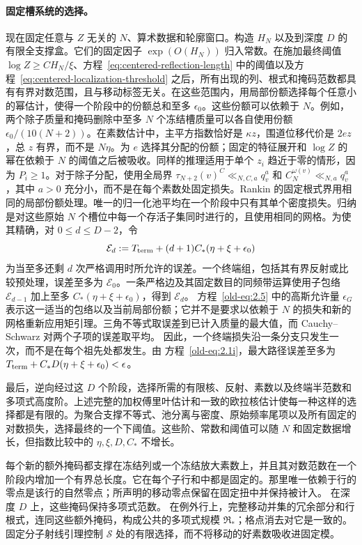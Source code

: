 \documentclass[11pt,a4paper]{article}
\numberwithin{equation}{section}
\numberwithin{figure}{section}
\theoremstyle{definition}
\theoremstyle{remark}
\begin{document}
\paragraph{固定槽系统的选择。}
现在固定任意与 \(Z\) 无关的 \(N\)、算术数据和轮廓窗口。构造 \(H_N\) 以及到深度 \(D\) 的有限全支撑盒。它们的固定因子 \(\exp(O(H_N))\) 归入常数。在施加最终阈值 \(\log Z\ge C H_N/\xi\)、方程~\eqref{eq:centered-reflection-length} 中的阈值以及方程~\eqref{eq:centered-localization-threshold} 之后，所有出现的列、根式和掩码范数都具有有界对数范围，且与移动标签无关。在这些范围内，用局部份额选择每个任意小的幂估计，使得一个阶段中的份额总和至多 \(\epsilon_0\)。这些份额可以依赖于 \(N\)。例如，两个除子质量和掩码删除中至多 \(N\) 个冻结槽质量可以各自使用份额 \(\epsilon_0/(10(N+2))\)。在素数估计中，主平方指数恰好是 \(\kappa z\)，围道位移代价是 \(2e z\)，总 \(z\) 有界，而不是 \(N\eta\)。为 \(e\) 选择其分配的份额；固定的特征展开和 \(\log Z\) 的幂在依赖于 \(N\) 的阈值之后被吸收。同样的推理适用于单个 \(z_i\) 趋近于零的情形，因为 \(P_i\ge1\)。对于除子分配，使用全局界 \(\tau_{N+2}(v)^C\ll_{N,C,a}q_v^a\) 和 \(C_N^{\omega(v)}\ll_{N,a}q_v^a\)，其中 \(a>0\) 充分小，而不是在每个素数处固定损失。Rankin 的固定根式界用相同的局部份额处理。唯一的归一化池平均在一个阶段中只有其单个密度损失。归纳是对这些原始 \(N\) 个槽位中每一个存活子集同时进行的，且使用相同的网格。为使其精确，对
\(0\le d\le D-2\)，令
\[
 \mathcal E_d
 :=T_{\rm term}+(d+1)C_*(\eta+\xi+\epsilon_0)
\]
为当至多还剩 \(d\) 次严格调用时所允许的误差。一个终端组，包括其有界反射或比较预处理，误差至多为 \(\mathcal E_0\)。一条严格边及其固定数目的同频带运算使用子包络
\(\mathcal E_{d-1}\) 加上至多
\(C_*(\eta+\xi+\epsilon_0)\)，得到 \(\mathcal E_d\)。
方程~\eqref{old-eq:2.5} 中的高斯允许量 \(\epsilon_G\) 表示这一适当的包络以及当前局部份额；它并不是要求以依赖于 \(N\) 的损失和新的网格重新应用矩引理。三角不等式取误差到已计入质量的最大值，而 Cauchy--Schwarz 对两个子项的误差取平均。
因此，一个终端损失沿一条分支只发生一次，而不是在每个祖先处都发生。由
方程~\eqref{old-eq:2.1i}，最大路径误差至多为
\(T_{\rm term}+C_*D(\eta+\xi+\epsilon_0)<\epsilon\)。

最后，逆向经过这 \(D\) 个阶段，选择所需的有限核、反射、素数以及终端半范数和多项式高度阶。上述完整的加权傅里叶估计和一致的欧拉核估计使每一种这样的选择都是有限的。为聚合支撑不等式、池分离与密度、原始频率尾项以及所有固定的对数损失，选择最终的一个下阈值。这些阶、常数和阈值可以随 \(N\) 和固定数据增长，但指数比较中的 \(\eta,\xi,D,C_*\) 不增长。

每个新的额外掩码都支撑在冻结列或一个冻结放大素数上，并且其对数范数在一个阶段内增加一个有界总长度。它在每个子行和中都是固定的。那里唯一依赖于行的零点是该行的自然零点；所声明的移动零点保留在固定扭中并保持被计入。
在深度 \(D\) 上，这些掩码保持多项式范数。
在例外行上，完整移动并集的冗余部分和行根式，连同这些额外掩码，构成公共的多项式规模 \(\mathfrak R_*\)；格点消去对它是一致的。固定分子射线引理控制 \(\mathcal S\) 处的有限选择，而不将移动的好素数吸收进固定模。
\end{document}
